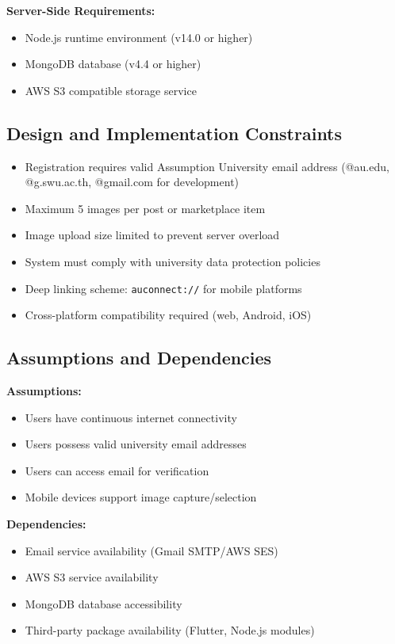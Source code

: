 \documentclass[12pt,a4paper]{article}
\begin{document}
\textbf{Server-Side Requirements:}
\begin{itemize}
    \item Node.js runtime environment (v14.0 or higher)
    \item MongoDB database (v4.4 or higher)
    \item AWS S3 compatible storage service
\end{itemize}

\subsection{Design and Implementation Constraints}
\begin{itemize}
    \item Registration requires valid Assumption University email address (@au.edu, @g.swu.ac.th, @gmail.com for development)
    \item Maximum 5 images per post or marketplace item
    \item Image upload size limited to prevent server overload
    \item System must comply with university data protection policies
    \item Deep linking scheme: \texttt{auconnect://} for mobile platforms
    \item Cross-platform compatibility required (web, Android, iOS)
\end{itemize}

\subsection{Assumptions and Dependencies}
\textbf{Assumptions:}
\begin{itemize}
    \item Users have continuous internet connectivity
    \item Users possess valid university email addresses
    \item Users can access email for verification
    \item Mobile devices support image capture/selection
\end{itemize}

\textbf{Dependencies:}
\begin{itemize}
    \item Email service availability (Gmail SMTP/AWS SES)
    \item AWS S3 service availability
    \item MongoDB database accessibility
    \item Third-party package availability (Flutter, Node.js modules)
\end{itemize}
\end{document}
